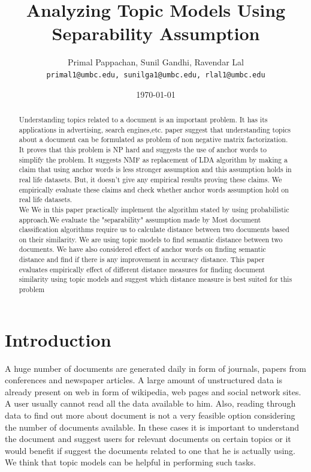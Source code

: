 \documentclass[a4paper,11pt]{article}
\begin{document}

\title{Analyzing Topic Models Using Separability Assumption}
\author{Primal Pappachan, Sunil Gandhi, Ravendar Lal \\ 
\texttt{primal1@umbc.edu, sunilga1@umbc.edu, rlal1@umbc.edu}}
\date{\today}
\maketitle



\begin{abstract}
Understanding topics related to a document is an important problem. It has its applications in advertising, search engines,etc. \cite{tm} paper suggest that understanding topics about a document can be formulated as problem of non negative matrix factorization. It proves that this problem is NP hard and suggests the use of anchor words to simplify the problem. It suggests NMF as replacement of LDA algorithm by making a claim that using anchor words is less stronger assumption and this assumption holds in real life datasets. But, it doesn't give any empirical results proving these claims. We empirically evaluate these claims and check whether anchor words assumption hold on real life datasets. \\

{\color{orange} 
We 
We in this paper practically implement the algorithm stated by \cite{tm} using probabilistic approach.We evaluate the "separability" assumption made by 
Most document classification algorithms require us to calculate distance between two documents based on their similarity. We are using topic models to find semantic distance between two documents. We have also considered effect of anchor words on finding semantic distance and find if there is any improvement in accuracy distance. This paper evaluates empirically effect of different distance measures for finding document similarity using topic models and suggest which distance measure is best suited for this problem
}
\end{abstract}

\pagebreak

\section{Introduction}
A huge number of documents are generated daily in form of journals, papers from conferences and newspaper articles. A large amount of unstructured data is already present on web in form of wikipedia, web pages and social network sites. A user usually cannot read all the data available to him. Also, reading through data to find out more about document is not a very feasible option considering the number of documents available. In these cases it is important to understand the document and suggest users for relevant documents on certain topics or it would benefit if suggest the documents related to one that he is actually using. We think that topic models can be helpful in performing such tasks. \\
\end{document}
